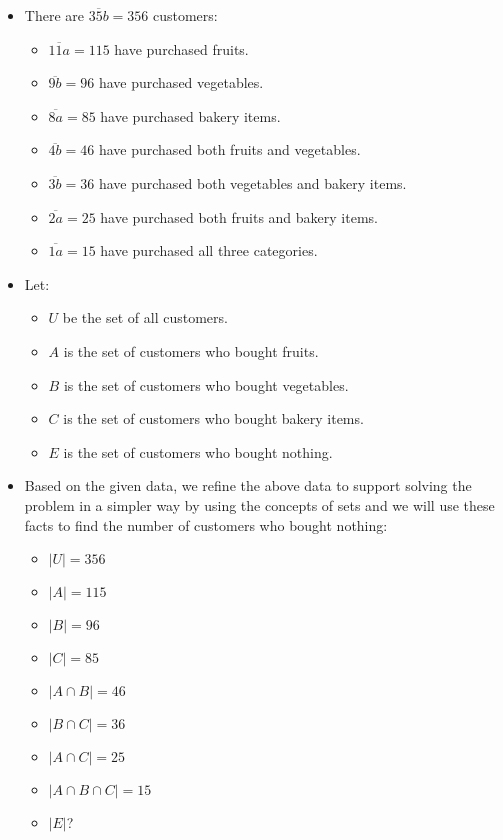 \documentclass[12pt, a4paper, twoside]{report} %
\begin{document}
  \begin{itemize}
    \item There are $\overline{35b} = 356$ customers:
    \begin{itemize}
      \item $\overline{11a} = 115$ have purchased fruits.
      \item $\overline{9b} = 96$ have purchased vegetables.
      \item $\overline{8a} = 85$ have purchased bakery items.
      \item $\overline{4b} = 46$ have purchased both fruits and vegetables.
      \item $\overline{3b} = 36$ have purchased both vegetables and bakery items.
      \item $\overline{2a} = 25$ have purchased both fruits and bakery items.
      \item $\overline{1a} = 15$ have purchased all three categories.
    \end{itemize}
    \item Let:
    \begin{itemize}
      \item $U$ be the set of all customers.
      \item $A$ is the set of customers who bought fruits.
      \item $B$ is the set of customers who bought vegetables.
      \item $C$ is the set of customers who bought bakery items.
      \item $E$ is the set of customers who bought nothing.
    \end{itemize}
    \item Based on the given data, we refine the above data to support solving the problem in a simpler way by using the concepts of sets and we will use these facts to find the number of customers who bought nothing:
    \begin{itemize}
      \item $|U| = 356$
      \item $|A| = 115$
      \item $|B| = 96$
      \item $|C| = 85$
      \item $|A \cap B| = 46$
      \item $|B \cap C| = 36$
      \item $|A \cap C| = 25$
      \item $|A \cap B \cap C| = 15$
      \item $|E|$?
    \end{itemize}
  \end{itemize}
\end{document}
